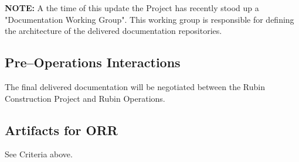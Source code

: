 {\bf NOTE:} A the time of this update the Project has recently stood up a "Documentation Working Group".  This working group is responsible for defining the architecture of the delivered documentation repositories.

\subsection{Pre--Operations Interactions}

The final delivered documentation will be negotiated between the Rubin Construction Project and Rubin Operations.

\subsection{Artifacts for ORR}

See Criteria above.

